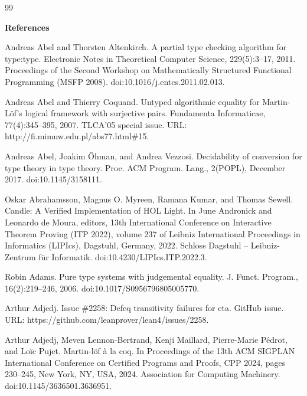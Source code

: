 \documentclass[10pt,a4paper]{amsart}
\begin{document}
\begin{thebibliography}{99}

 
\par\medskip\noindent\textbf{References}\par
  
\par\noindent  [1]  Andreas Abel and Thorsten Altenkirch.  A partial type checking algorithm for type:type.  Electronic Notes in Theoretical Computer Science, 229(5):3–17, 2011.  Proceedings of the Second Workshop on Mathematically Structured Functional Programming (MSFP 2008).  doi:10.1016/j.entcs.2011.02.013.  
 
\par\noindent  [2]  Andreas Abel and Thierry Coquand.  Untyped algorithmic equality for Martin-Löf’s logical framework with surjective pairs.  Fundamenta Informaticae, 77(4):345–395, 2007.  TLCA’05 special issue.  URL: http://fi.mimuw.edu.pl/abs77.html\#15.  
 
\par\noindent  [3]  Andreas Abel, Joakim Öhman, and Andrea Vezzosi.  Decidability of conversion for type theory in type theory.  Proc. ACM Program. Lang., 2(POPL), December 2017.  doi:10.1145/3158111.  
 
\par\noindent  [4]  Oskar Abrahamsson, Magnus O. Myreen, Ramana Kumar, and Thomas Sewell.  Candle: A Verified Implementation of HOL Light.  In June Andronick and Leonardo de Moura, editors, 13th International Conference on Interactive Theorem Proving (ITP 2022), volume 237 of Leibniz International Proceedings in Informatics (LIPIcs), Dagstuhl, Germany, 2022. Schloss Dagstuhl – Leibniz-Zentrum für Informatik.  doi:10.4230/LIPIcs.ITP.2022.3.  
 
\par\noindent  [5]  Robin Adams.  Pure type systems with judgemental equality.  J. Funct. Program., 16(2):219–246, 2006.  doi:10.1017/S0956796805005770.  
 
\par\noindent  [6]  Arthur Adjedj.  Issue \#2258: Defeq transitivity failures for eta.  GitHub issue.  URL: https://github.com/leanprover/lean4/issues/2258.  
 
\par\noindent  [7]  Arthur Adjedj, Meven Lennon-Bertrand, Kenji Maillard, Pierre-Marie Pédrot, and Loïc Pujet.  Martin-löf à la coq.  In Proceedings of the 13th ACM SIGPLAN International Conference on Certified Programs and Proofs, CPP 2024, pages 230–245, New York, NY, USA, 2024. Association for Computing Machinery.  doi:10.1145/3636501.3636951.  
 

\end{thebibliography}
\end{document}
